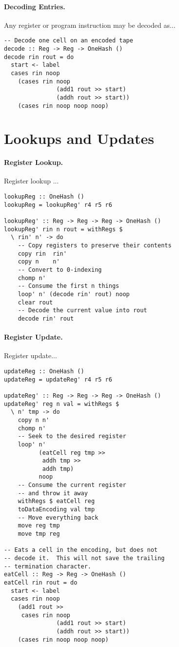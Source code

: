 \documentclass[10pt, preprint, nocopyrightspace]{sigplanconf}
\begin{document}
\paragraph{Decoding Entries.}

Any register or program instruction may be decoded as...

\begin{lstlisting}
-- Decode one cell on an encoded tape
decode :: Reg -> Reg -> OneHash ()
decode rin rout = do
  start <- label
  cases rin noop
    (cases rin noop 
               (add1 rout >> start) 
               (addh rout >> start))
    (cases rin noop noop noop)
\end{lstlisting}

\section{Lookups and Updates}

\paragraph{Register Lookup.}

Register lookup ...

\begin{lstlisting}
lookupReg :: OneHash ()
lookupReg = lookupReg' r4 r5 r6

lookupReg' :: Reg -> Reg -> Reg -> OneHash ()
lookupReg' rin n rout = withRegs $ 
  \ rin' n' -> do
    -- Copy registers to preserve their contents
    copy rin  rin'
    copy n    n'
    -- Convert to 0-indexing
    chomp n'
    -- Consume the first n things
    loop' n' (decode rin' rout) noop
    clear rout
    -- Decode the current value into rout
    decode rin' rout
\end{lstlisting}

\paragraph{Register Update.}

Register update...

\begin{lstlisting}
updateReg :: OneHash ()
updateReg = updateReg' r4 r5 r6

updateReg' :: Reg -> Reg -> Reg -> OneHash ()
updateReg' reg n val = withRegs $ 
  \ n' tmp -> do
    copy n n'
    chomp n'
    -- Seek to the desired register
    loop' n' 
          (eatCell reg tmp >> 
           addh tmp >> 
           addh tmp) 
          noop
    -- Consume the current register 
    -- and throw it away
    withRegs $ eatCell reg
    toDataEncoding val tmp
    -- Move everything back
    move reg tmp
    move tmp reg

-- Eats a cell in the encoding, but does not 
-- decode it.  This will not save the trailing 
-- termination character.
eatCell :: Reg -> Reg -> OneHash ()
eatCell rin rout = do
  start <- label
  cases rin noop
    (add1 rout >> 
     cases rin noop 
               (add1 rout >> start) 
               (addh rout >> start))
    (cases rin noop noop noop)
\end{lstlisting}
\end{document}
